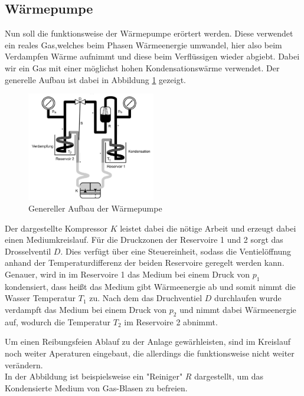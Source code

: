 \subsection*{Wärmepumpe}
Nun soll die funktionsweise der Wärmepumpe erörtert werden.
Diese verwendet ein reales Gas,welches beim Phasen Wärmeenergie umwandel, hier also beim Verdampfen Wärme 
aufnimmt und diese beim Verflüssigen wieder abgiebt.
Dabei wir ein Gas mit einer möglichst hohen Kondensationswärme verwendet.
Der generelle Aufbau ist dabei in Abbildung \ref{fig:aufbau_generell} gezeigt.
\begin{figure}[H]
    \centering
    \includegraphics[width=0.5\textwidth]{bilder/aufbau_generell.jpg}
    \caption{Genereller Aufbau der Wärmepumpe \cite[196]{Anleitung}}
    \label{fig:aufbau_generell}
\end{figure}
Der dargestellte Kompressor $K$ leistet dabei die nötige Arbeit und 
erzeugt dabei einen Mediumkreislauf. Für die Druckzonen
der Reservoire 1 und 2 sorgt das Drosselventil $D$.
Dies verfügt über eine Steuereinheit, sodass die Ventielöffnung
anhand der Temperaturdifferenz der beiden Reservoire geregelt werden kann.\\

Genauer, wird in im Reservoire 1 das Medium bei einem Druck von $p_1$ kondensiert, dass heißt das Medium gibt Wärmeenergie
ab und somit nimmt die Wasser Temperatur $T_1$ zu.
Nach dem das Druchventiel $D$ durchlaufen wurde verdampft das Medium bei einem Druck von $p_2$ und nimmt dabei Wärmeenergie auf,
wodurch die Temperatur $T_2$ im Reservoire 2 abnimmt.

Um einen Reibungsfeien Ablauf zu der Anlage gewärhleisten, sind
im Kreislauf noch weiter Aperaturen eingebaut, die allerdings die funktionsweise
nicht weiter verändern.\\
In der Abbildung ist beispielsweise ein "Reiniger" $R$ dargestellt, um 
das Kondensierte Medium von Gas-Blasen zu befreien.  


